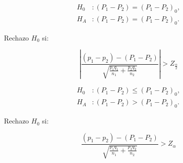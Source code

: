 \begin{minipage}[c]{\textwidth}
    \begin{minipage}[c]{0.3 \textwidth}\item
    	\begin{align*}
    	H_0&: (P_{1}-P_{2}) = (P_{1}-P_{2})_0,\\
    	H_A&: (P_{1}-P_{2}) = (P_{1}-P_{2})_0.    	
    	\end{align*}\end{minipage} \hfill
    \begin{minipage}[b]{0.3 \textwidth}\item
				Rechazo	$H_0$ si:		
		\end{minipage} \hfill
    \begin{minipage}[c]{0.3 \textwidth}\item
	 $$\left|\frac { (p_{ 1 }-p_{ 2 })-(P_{ 1 }-P_{ 2 }) }{ \sqrt { \frac { p_{ 1 }q_{ 1 } }{ n_{ 1 } } +\frac { p_{ 2 }q_{ 2 } }{ n_{ 2 } }  }  }  \right| > Z_{\frac{\alpha}{2}}$$
    \end{minipage}
    \end{minipage}
    
    
	\begin{minipage}[c]{\textwidth}
    \begin{minipage}[c]{0.3 \textwidth}\item
    	\begin{align*}
    	H_0&: (P_{1}-P_{2}) \le (P_{1}-P_{2})_0,\\
    	H_A&: (P_{1}-P_{2}) > (P_{1}-P_{2})_0.    	
    	\end{align*}\end{minipage} \hfill
    \begin{minipage}[b]{0.3 \textwidth}\item
				Rechazo $H_0$ si:		
		\end{minipage} \hfill
    \begin{minipage}[c]{0.3 \textwidth}\item
	 $$\frac { (p_{ 1 }-p_{ 2 })-(P_{ 1 }-P_{ 2 }) }{ \sqrt { \frac { p_{ 1 }q_{ 1 } }{ n_{ 1 } } +\frac { p_{ 2 }q_{ 2 } }{ n_{ 2 } }  }  }  > Z_{\alpha}$$
    \end{minipage}
    \end{minipage}
    
